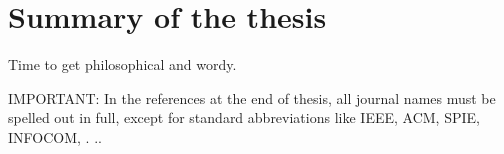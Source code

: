 \documentclass[../main.tex]{subfiles}
\begin{document}
\clearpage


\section{
  Summary of the thesis}

Time to get philosophical and wordy.

IMPORTANT: In the references at the end of thesis, all journal names must be spelled out in full, except for standard abbreviations like IEEE, ACM, SPIE, INFOCOM, .
..
\end{document}
